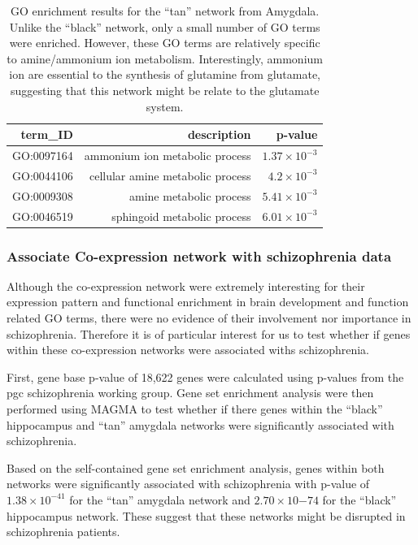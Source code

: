 \documentclass[12pt]{book}
\begin{document}
	\begin{table}[h]
		\centering
		\caption[ enrichment results for the ``tan'' network from Amygdala]{\gls{GO} enrichment results for the ``tan'' network from Amygdala.
			Unlike the ``black'' network, only a small number of \gls{GO} terms were enriched. 
			However, these \gls{GO} terms are relatively specific to amine/ammonium ion metabolism.
			Interestingly, ammonium ion are essential to the synthesis of glutamine from glutamate, suggesting that this network might be relate to the glutamate system.
			}
		\begin{tabular}{rrr}
				\toprule
				term\_ID & description & p-value \\
				\midrule
				GO:0097164 & ammonium ion metabolic process & $1.37\times 10^{-3}$ \\
				GO:0044106 & cellular amine metabolic process & $4.2\times 10^{-3}$ \\
				GO:0009308 & amine metabolic process & $5.41\times 10^{-3}$ \\
				GO:0046519 & sphingoid metabolic process & $6.01\times 10^{-3}$ \\
				\bottomrule
		\end{tabular}%
		\label{tab:tanGO}%
	\end{table}%

	\subsubsection{Associate Co-expression network with  schizophrenia data}
	Although the co-expression network were extremely interesting for their expression pattern and functional enrichment in brain development and function related \gls{GO} terms, there were no evidence of their involvement nor importance in schizophrenia.
	Therefore it is of particular interest for us to test whether if genes within these co-expression networks were associated withs schizophrenia. 
	
	First, gene base p-value of 18,622 genes were calculated using p-values from the \gls{pgc} schizophrenia working group\citep{Ripke2014}.
	Gene set enrichment analysis were then performed using \gls{MAGMA}\citep{DeLeeuw2015} to test whether if there genes within the ``black'' hippocampus and ``tan'' amygdala networks were significantly associated with schizophrenia.
	
	Based on the self-contained gene set enrichment analysis, genes within both networks were significantly associated with schizophrenia with p-value of $1.38\times 10^{-41}$ for the ``tan'' amygdala network and $2.70\times 10{-74}$ for the ``black'' hippocampus network.
	These suggest that these networks might be disrupted in schizophrenia patients.
	
\end{document}
